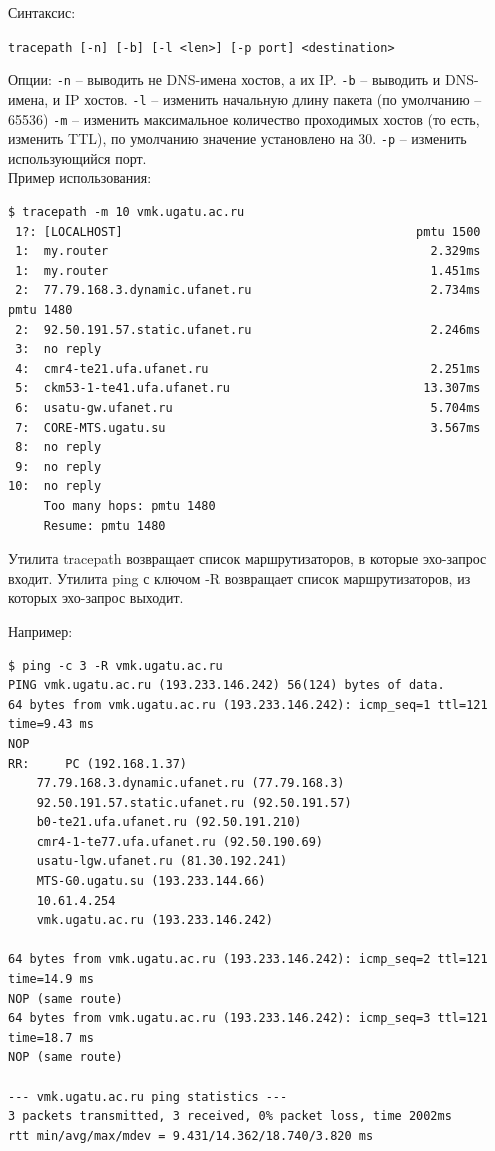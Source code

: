 \documentclass[a4paper]{article}
\begin{document}
			Синтаксис:
			
			\texttt{tracepath [-n] [-b] [-l <len>] [-p port] <destination>}
			
			Опции:
			\texttt{-n} -- выводить не DNS-имена хостов, а их IP.
			\texttt{-b} -- выводить и DNS-имена, и IP хостов.
			\texttt{-l} -- изменить начальную длину пакета (по умолчанию -- 65536)
			\texttt{-m} -- изменить максимальное количество проходимых хостов (то есть, изменить TTL), по умолчанию значение установлено на 30.
			\texttt{-p} -- изменить использующийся порт.\\
			
			Пример использования:
			\begin{verbatim}
$ tracepath -m 10 vmk.ugatu.ac.ru
 1?: [LOCALHOST]                                         pmtu 1500
 1:  my.router                                             2.329ms 
 1:  my.router                                             1.451ms 
 2:  77.79.168.3.dynamic.ufanet.ru                         2.734ms pmtu 1480
 2:  92.50.191.57.static.ufanet.ru                         2.246ms 
 3:  no reply
 4:  cmr4-te21.ufa.ufanet.ru                               2.251ms 
 5:  ckm53-1-te41.ufa.ufanet.ru                           13.307ms 
 6:  usatu-gw.ufanet.ru                                    5.704ms 
 7:  CORE-MTS.ugatu.su                                     3.567ms 
 8:  no reply
 9:  no reply
10:  no reply
     Too many hops: pmtu 1480
     Resume: pmtu 1480 
			\end{verbatim}
			
			Утилита tracepath возвращает список маршрутизаторов, в которые эхо-запрос входит. Утилита ping с ключом -R возвращает список маршрутизаторов, из которых эхо-запрос выходит.	
			
			Например:
			\begin{verbatim}
$ ping -c 3 -R vmk.ugatu.ac.ru
PING vmk.ugatu.ac.ru (193.233.146.242) 56(124) bytes of data.
64 bytes from vmk.ugatu.ac.ru (193.233.146.242): icmp_seq=1 ttl=121 time=9.43 ms
NOP
RR: 	PC (192.168.1.37)
	77.79.168.3.dynamic.ufanet.ru (77.79.168.3)
	92.50.191.57.static.ufanet.ru (92.50.191.57)
	b0-te21.ufa.ufanet.ru (92.50.191.210)
	cmr4-1-te77.ufa.ufanet.ru (92.50.190.69)
	usatu-lgw.ufanet.ru (81.30.192.241)
	MTS-G0.ugatu.su (193.233.144.66)
	10.61.4.254
	vmk.ugatu.ac.ru (193.233.146.242)

64 bytes from vmk.ugatu.ac.ru (193.233.146.242): icmp_seq=2 ttl=121 time=14.9 ms
NOP	(same route)
64 bytes from vmk.ugatu.ac.ru (193.233.146.242): icmp_seq=3 ttl=121 time=18.7 ms
NOP	(same route)

--- vmk.ugatu.ac.ru ping statistics ---
3 packets transmitted, 3 received, 0% packet loss, time 2002ms
rtt min/avg/max/mdev = 9.431/14.362/18.740/3.820 ms

			\end{verbatim}
			
\end{document}
